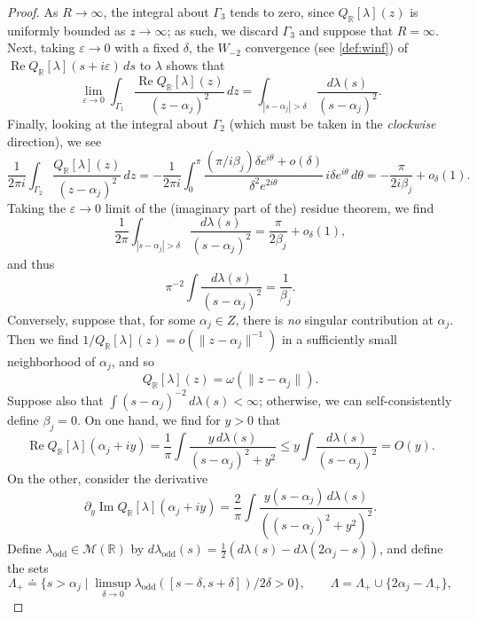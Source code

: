 \documentclass{cams-l} %
\newcommand{\RR}{\mathbb R}
\newcommand{\cM}{\mathcal M}
\newcommand{\eps}{\varepsilon}
\newcommand{\op}{\operatorname}
\renewcommand{\Re}{\op{Re}}
\renewcommand{\Im}{\op{Im}}
\theoremstyle{definition}
\theoremstyle{remark}
\numberwithin{equation}{section}
\begin{document}
\begin{proof}
    As $R\to\infty$, the integral about $\Gamma_3$ tends to zero, since $Q_{\RR}[\lambda](z)$ is uniformly bounded as $z\to\infty$; as such, we discard $\Gamma_3$ and suppose that $R=\infty$. Next, taking $\eps\to 0$ with a fixed $\delta$, the $W_{-2}$ convergence (see \cref{def:winf}) of $\Re Q_{\RR}[\lambda](s+i\eps)\,ds$ to $\lambda$ shows that
    \[\lim_{\eps\to 0}\int_{\Gamma_1}\frac{\Re Q_{\RR}[\lambda](z)}{(z-\alpha_j)^2}\,dz = \int_{|s-\alpha_j|>\delta}\frac{d\lambda(s)}{(s-\alpha_j)^2}.\]
    Finally, looking at the integral about $\Gamma_2$ (which must be taken in the \emph{clockwise} direction), we see
    \[\frac{1}{2\pi i}\int_{\Gamma_2} \frac{Q_{\RR}[\lambda](z)}{(z-\alpha_j)^2}\,dz = -\frac{1}{2\pi i}\int_{0}^\pi \frac{(\pi/i\beta_j) \delta e^{i\theta} + o(\delta)}{\delta^2e^{2i\theta}}\,i\delta e^{i\theta}\,d\theta = -\frac{\pi}{2 i\beta_j} + o_\delta(1).\]
    Taking the $\eps\to 0$ limit of the (imaginary part of the) residue theorem, we find
    \[\frac{1}{2\pi}\int_{|s-\alpha_j|>\delta}\frac{d\lambda(s)}{(s-\alpha_j)^2} = \frac{\pi}{2\beta_j} + o_\delta(1),\]
    and thus
    \[\pi^{-2}\int\frac{d\lambda(s)}{(s-\alpha_j)^2} = \frac{1}{\beta_j}.\]
    Conversely, suppose that, for some $\alpha_j\in Z$, there is \emph{no} singular contribution at $\alpha_j$. Then we find $1/Q_{\RR}[\lambda](z) = o(\|z-\alpha_j\|^{-1})$ in a sufficiently small neighborhood of $\alpha_j$, and so
    \begin{equation}\label{eq:lowerboundproof}
        Q_{\RR}[\lambda](z) = \omega(\|z-\alpha_j\|).
    \end{equation}
    Suppose also that $\int(s-\alpha_j)^{-2}\,d\lambda(s)<\infty$; otherwise, we can self-consistently define $\beta_j=0$. On one hand, we find for $y>0$ that
    \begin{equation}\label{eq:boundreal}
        \Re Q_\RR[\lambda](\alpha_j+iy) =\frac{1}{\pi}\int \frac{y\,d\lambda(s)}{(s-\alpha_j)^2+y^2}\leq y\int\frac{d\lambda(s)}{(s-\alpha_j)^2} = O(y).
    \end{equation}
    On the other, consider the derivative
    \begin{equation}\label{eq:deriv_H}
        \partial_y\Im Q_{\RR}[\lambda](\alpha_j+iy) = \frac{2}{\pi}\int \frac{y(s-\alpha_j)\,d\lambda(s)}{((s-\alpha_j)^2+y^2)^2}.
    \end{equation}
    Define $\lambda_\mathrm{odd}\in\cM(\RR)$ by $d\lambda_\mathrm{odd}(s) = \frac{1}{2}\left(d\lambda(s) - d\lambda(2\alpha_j-s)\right)$, and define the sets
    \[\Lambda_+\doteq\Big\{s>\alpha_j\;\Big|\;\limsup_{\delta\to 0}\lambda_\mathrm{odd}([s-\delta,s+\delta])/2\delta > 0\Big\},\qquad \Lambda = \Lambda_+\cup\{2\alpha_j - \Lambda_+\},\]

\end{proof}
\end{document}
